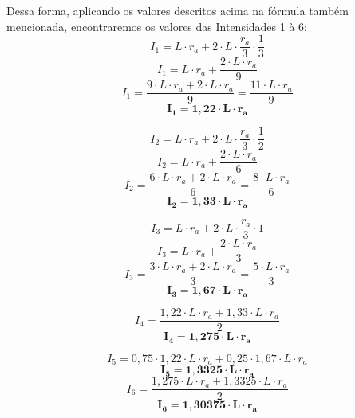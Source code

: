 \noindent Dessa forma, aplicando os valores descritos acima na fórmula também mencionada, encontraremos os valores das Intensidades 1 à 6:
\[I_1 = L \cdot r_a + 2 \cdot L \cdot \frac{r_a}{3} \cdot \frac{1}{3}\]
\[I_1 = L \cdot r_a + \frac{2 \cdot L \cdot r_a}{9}\]
\[I_1 = \frac{9 \cdot L \cdot r_a + 2 \cdot L \cdot r_a}{9} = \frac{11 \cdot L \cdot r_a}{9}\]
\[\mathbf{I_1 = 1,22 \cdot L \cdot r_a}\]

\[I_2 = L \cdot r_a + 2 \cdot L \cdot \frac{r_a}{3} \cdot \frac{1}{2}\]
\[I_2 = L \cdot r_a + \frac{2 \cdot L \cdot r_a}{6}\]
\[I_2 = \frac{6 \cdot L \cdot r_a + 2 \cdot L \cdot r_a}{6} = \frac{8 \cdot L \cdot r_a}{6}\]
\[\mathbf{I_2 = 1,33 \cdot L \cdot r_a}\]

\[I_3 = L \cdot r_a + 2 \cdot L \cdot \frac{r_a}{3} \cdot 1\]
\[I_3 = L \cdot r_a + \frac{2 \cdot L \cdot r_a}{3}\]
\[I_3 = \frac{3 \cdot L \cdot r_a + 2 \cdot L \cdot r_a}{3} = \frac{5 \cdot L \cdot r_a}{3}\]
\[\mathbf{I_3 = 1,67 \cdot L \cdot r_a}\]

\[I_4 = \frac{1,22 \cdot L \cdot r_a + 1,33 \cdot L \cdot r_a}{2}\]
\[\mathbf{I_4 = 1,275 \cdot L \cdot r_a}\]

\[I_5 = 0,75 \cdot 1,22 \cdot L \cdot r_a + 0,25 \cdot 1,67 \cdot L \cdot r_a\]
\[\mathbf{I_5 = 1,3325 \cdot L \cdot r_a}\]
\vspace{0.2cm}
\[I_6 = \frac{1,275 \cdot L \cdot r_a + 1,3325 \cdot L \cdot r_a}{2}\]
\[\mathbf{I_6 = 1,30375 \cdot L \cdot r_a}\]
\vspace{1cm}

